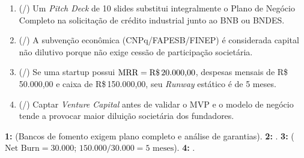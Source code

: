 \begin{boxTeste}
  \begin{enumerate}[leftmargin=1.5em, itemsep=4pt]
    \item (\V/\F) Um \textit{Pitch Deck} de 10 slides substitui integralmente o Plano de Negócio Completo na solicitação de crédito industrial junto ao BNB ou BNDES.
    \item (\V/\F) A subvenção econômica (CNPq/FAPESB/FINEP) é considerada capital não dilutivo porque não exige cessão de participação societária.
    \item (\V/\F) Se uma startup possui $\text{MRR} = \text{R\$\,20.000,00}$, despesas mensais de R\$\,50.000,00 e caixa de R\$\,150.000,00, seu \textit{Runway} estático é de 5 meses.
    \item (\V/\F) Captar \textit{Venture Capital} antes de validar o MVP e o modelo de negócio tende a provocar maior diluição societária dos fundadores.
  \end{enumerate}
  \begin{boxGabarito}
    \textbf{1: \F} (Bancos de fomento exigem plano completo e análise de garantias). \quad \textbf{2: \V}. \quad \textbf{3: \V} ($\text{Net Burn} = 30.000$; $150.000 / 30.000 = 5\text{ meses}$). \quad \textbf{4: \V}.
  \end{boxGabarito}
\end{boxTeste}
